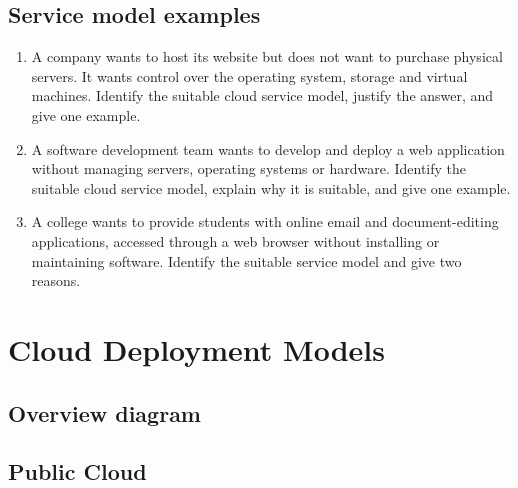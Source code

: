 \documentclass[11pt,a4paper]{article}
\begin{document}

\subsection*{Service model examples}

\begin{enumerate}\itemsep6pt
  \item A company wants to host its website but does not want to purchase physical servers. It
        wants control over the operating system, storage and virtual machines. Identify the
        suitable cloud service model, justify the answer, and give one example.
  \item A software development team wants to develop and deploy a web application without
        managing servers, operating systems or hardware. Identify the suitable cloud service
        model, explain why it is suitable, and give one example.
  \item A college wants to provide students with online email and document-editing
        applications, accessed through a web browser without installing or maintaining
        software. Identify the suitable service model and give two reasons.
\end{enumerate}

\section{Cloud Deployment Models}

\subsection{Overview diagram}

\subsection{Public Cloud}


\end{document}
